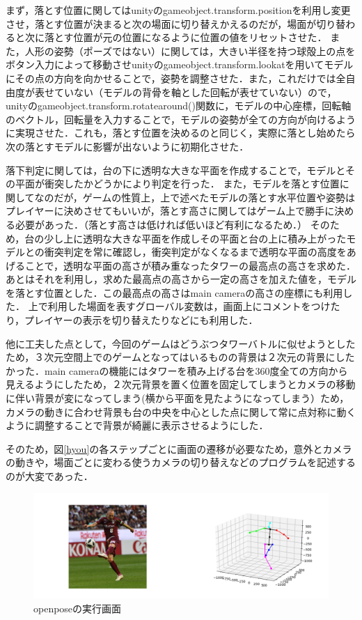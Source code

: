 \documentclass[uplatex,titlepage]{jsarticle}
\begin{document}
まず，落とす位置に関してはunityのgameobject.transform.positionを利用し変更させ，落とす位置が決まると次の場面に切り替えかえるのだが，場面が切り替わると次に落とす位置が元の位置になるように位置の値をリセットさせた．
また，人形の姿勢（ポーズではない）に関しては，大きい半径を持つ球殻上の点をボタン入力によって移動させunityのgameobject.transform.lookatを用いてモデルにその点の方向を向かせることで，姿勢を調整させた．また，これだけでは全自由度が表せていない（モデルの背骨を軸とした回転が表せていない）ので，unityのgameobject.transform.rotatearound()関数に，モデルの中心座標，回転軸のベクトル，回転量を入力することで，モデルの姿勢が全ての方向が向けるように実現させた．これも，落とす位置を決めるのと同じく，実際に落とし始めたら次の落とすモデルに影響が出ないように初期化させた．

落下判定に関しては，台の下に透明な大きな平面を作成することで，モデルとその平面が衝突したかどうかにより判定を行った．
また，モデルを落とす位置に関してなのだが，ゲームの性質上，上で述べたモデルの落とす水平位置や姿勢はプレイヤーに決めさせてもいいが，落とす高さに関してはゲーム上で勝手に決める必要があった．（落とす高さは低ければ低いほど有利になるため．）
そのため，台の少し上に透明な大きな平面を作成しその平面と台の上に積み上がったモデルとの衝突判定を常に確認し，衝突判定がなくなるまで透明な平面の高度をあげることで，透明な平面の高さが積み重なったタワーの最高点の高さを求めた．あとはそれを利用し，求めた最高点の高さから一定の高さを加えた値を，モデルを落とす位置とした．この最高点の高さはmain cameraの高さの座標にも利用した．
上で利用した場面を表すグローバル変数は，画面上にコメントをつけたり，プレイヤーの表示を切り替えたりなどにも利用した．

他に工夫した点として，今回のゲームはどうぶつタワーバトルに似せようとしたため，３次元空間上でのゲームとなってはいるものの背景は２次元の背景にしたかった．main cameraの機能にはタワーを積み上げる台を360度全ての方向から見えるようにしたため，２次元背景を置く位置を固定してしまうとカメラの移動に伴い背景が変になってしまう(横から平面を見たようになってしまう）ため，カメラの動きに合わせ背景も台の中央を中心とした点に関して常に点対称に動くように調整することで背景が綺麗に表示させるようにした．



そのため，図\ref{hyou}の各ステップごとに画面の遷移が必要なため，意外とカメラの動きや，場面ごとに変わる使うカメラの切り替えなどのプログラムを記述するのが大変であった．
\begin{figure}
\begin{center}
   \includegraphics[width=15.0cm]{images/openpose.png}
 \caption{openposeの実行画面}
 \label{openpose}
 \end{center}
\end{figure}
\end{document}
